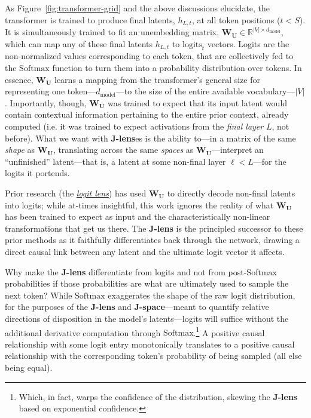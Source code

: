 \documentclass{article}
\newcommand{\logits}{\mathrm{logits}}
\newcommand{\smax}{\mathrm{Softmax}}
\newcommand{\dmodel}{d_{\text{model}}}
\begin{document}
As Figure~\ref{fig:transformer-grid} and the above discussions elucidate, the transformer is trained to produce final latents, \(h_{L,t}\), at all token positions (\(t < S\)). It is simultaneously trained to fit an unembedding matrix, \(\mathbf{W_U} \in \mathbb{R}^{|V| \times \dmodel}\), which can map any of these final latents \(h_{L, t}\) to \(\logits_{t}\) vectors. Logits are the non-normalized values corresponding to each token, that are collectively fed to the \(\smax\) function to turn them into a probability distribution over tokens. In essence, \(\mathbf{W_U}\) learns a mapping from the transformer's general size for representing one token---\(\dmodel\)---to the size of the entire available vocabulary---\(|V|\). Importantly, though, \(\mathbf{W_U}\) was trained to expect that its input latent would contain contextual information pertaining to the entire prior context, already computed (i.e. it was trained to expect activations from the \textit{final layer} \(L\), not before). What we want with \textbf{J-lens}es is the ability to---in a matrix of the same \textit{shape} as \(\mathbf{W_U}\), translating across the same \textit{spaces} as \(\mathbf{W_U}\)---interpret an ``unfinished'' latent---that is, a latent at some non-final layer \(\ell < L\)---for the logits it portends. 

Prior research (the \href{https://www.lesswrong.com/posts/AcKRB8wDpdaN6v6ru/interpreting-gpt-the-logit-lens}{\textit{logit lens}}) has used \(\mathbf{W_U}\) to directly decode non-final latents into logits; while at-times insightful, this work ignores the reality of what \(\mathbf{W_U}\) has been trained to expect as input and the characteristically non-linear transformations that get us there. The \textbf{J-lens} is the principled successor to these prior methods as it faithfully differentiates back through the network, drawing a direct causal link between any latent and the ultimate logit vector it affects.


Why make the \textbf{J-lens} differentiate from logits and not from post-\(\smax\) probabilities if those probabilities are what are ultimately used to sample the next token? While \(\smax\) exaggerates the shape of the raw logit distribution, for the purposes of the \textbf{J-lens} and \textbf{J-space}---meant to quantify relative directions of disposition in the model's latents---logits will suffice without the additional derivative computation through \(\smax\).\footnote{Which, in fact, warps the confidence of the distribution, skewing the \textbf{J-lens} based on exponential confidence.} A positive causal relationship with some logit entry monotonically translates to a positive causal relationship with the corresponding token's probability of being sampled (all else being equal). 
\end{document}
